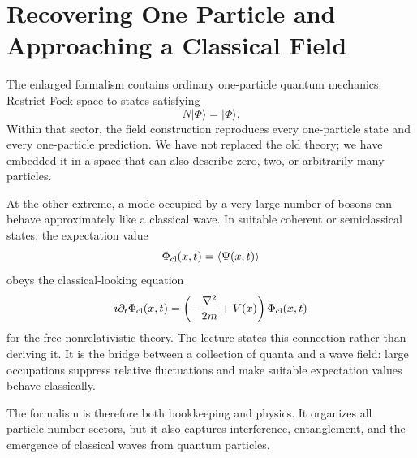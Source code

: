 \section{Recovering One Particle and Approaching a Classical Field}

The enlarged formalism contains ordinary one-particle quantum mechanics. Restrict Fock space to states satisfying
\begin{equation}
N|\Phi\rangle=|\Phi\rangle.
\end{equation}
Within that sector, the field construction reproduces every one-particle state and every one-particle prediction. We have not replaced the old theory; we have embedded it in a space that can also describe zero, two, or arbitrarily many particles.

At the other extreme, a mode occupied by a very large number of bosons can behave approximately like a classical wave. In suitable coherent or semiclassical states, the expectation value
\begin{equation}
\Phi_{\rm cl}(x,t)=\langle\Psi(x,t)\rangle
\end{equation}
obeys the classical-looking equation
\begin{equation}
i\partial_t\Phi_{\rm cl}(x,t)
=\left(-\frac{\nabla^2}{2m}+V(x)\right)\Phi_{\rm cl}(x,t)
\label{eq:l07-classical-schrodinger}
\end{equation}
for the free nonrelativistic theory. The lecture states this connection rather than deriving it. It is the bridge between a collection of quanta and a wave field: large occupations suppress relative fluctuations and make suitable expectation values behave classically.

The formalism is therefore both bookkeeping and physics. It organizes all particle-number sectors, but it also captures interference, entanglement, and the emergence of classical waves from quantum particles.

\begin{classroomqa}
\end{classroomqa}

